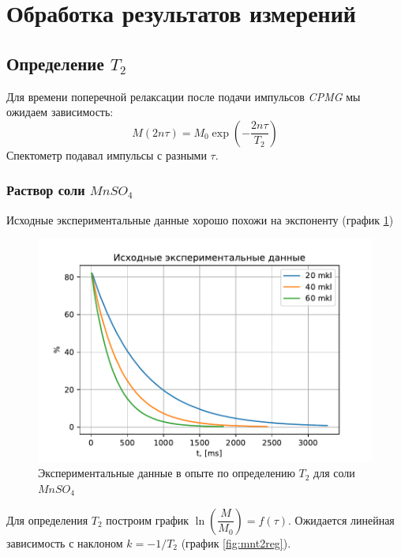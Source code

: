 \section{Обработка результатов измерений}
\subsection{Определение $T_2$}
Для времени поперечной релаксации после подачи импульсов \textit{CPMG} мы ожидаем зависимость:
\begin{equation}
\label{eq:M2-from-T2}
M (2n \tau) = M_0 \exp \left( -\dfrac{2n\tau}{T_2} \right)
\end{equation}
Спектометр подавал импульсы с разными $ \tau $.
\subsubsection{Раствор соли $MnSO_4$}
Исходные экспериментальные данные хорошо похожи на экспоненту (график \ref{fig:mnt2exper})
\begin{figure}[H]
	\hspace{-1em}
	\includegraphics[width=1.0\linewidth]{data/Mn_T_2_exper}
	\caption{Экспериментальные данные в опыте по определению $ T_2 $ для соли $ Mn SO_4 $}
	\label{fig:mnt2exper}
\end{figure}

Для определения $ T_2 $ построим график $ \ln \left(\dfrac{M}{M_0} \right) = f(\tau) $. Ожидается линейная зависимость с наклоном $ k = -1/T_2 $ (график \ref{fig:mnt2reg}).


